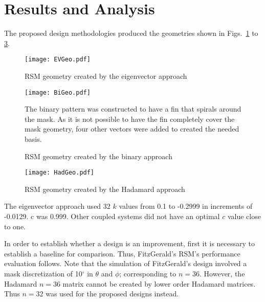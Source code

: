 \documentclass[3p,times]{elsarticle}
\begin{document}
\section{Results and Analysis}
The proposed design methodologies produced the geometries shown in Figs.~\ref{fig:EVGeo} to \ref{fig:HadGeo}.
\begin{figure}[ht!]
\centering
\texttt{[image: EVGeo.pdf]}
\caption{RSM geometry created by the eigenvector approach}
\label{fig:EVGeo}
\end{figure}
\begin{figure}[ht!]
\texttt{[image: BiGeo.pdf]}
\centering
\caption{RSM geometry created by the binary approach}
\label{fig:BiGeo}
The binary pattern was constructed to have a fin that spirals around the mask.  As it is not possible to have the fin completely cover the mask geometry, four other vectors were
added to created the needed basis.
\end{figure}
\begin{figure}[ht!]
\centering
\texttt{[image: HadGeo.pdf]}
\caption{RSM geometry created by the Hadamard approach}
\label{fig:HadGeo}
\end{figure}
The eigenvector approach used 32 $k$ values from 0.1 to -0.2999 in increments of -0.0129. c was 0.999.  Other coupled systems did not have an optimal 
$c$ value close to one.

In order to establish whether a design is an improvement, first it is necessary to establish a baseline for comparison.  Thus, FitzGerald's RSM's performance evaluation follows.  Note that the 
simulation of FitzGerald's design involved a mask discretization of 10$^\circ$ in $\theta$ and $\phi$; corresponding to $n=36$.  However, the Hadamard $n=36$
matrix cannot be created by lower order Hadamard matrices\cite{Weisstein}.  Thus $n=32$ was used for the proposed designs instead.
\end{document}

